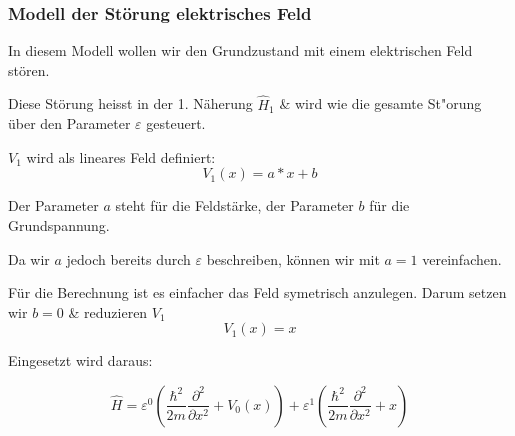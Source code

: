 \begin{refsection}
\subsubsection{ Modell der St\"orung elektrisches Feld }

In diesem Modell wollen wir den Grundzustand mit einem elektrischen Feld st\"oren.

Diese St\"orung heisst in der 1. N\"aherung $\hat H_1$ \& wird wie die gesamte St"orung \"uber den Parameter $\varepsilon$ gesteuert.

$V_1$ wird als lineares Feld definiert:
\begin{equation}
  V_1(x) = a*x + b
\end{equation}

Der Parameter $a$ steht f\"ur die Feldst\"arke, der Parameter $b$ f\"ur die Grundspannung.

Da wir $a$ jedoch bereits durch $\varepsilon$ beschreiben, k\"onnen wir mit $a = 1$ vereinfachen.

F\"ur die Berechnung ist es einfacher das Feld symetrisch anzulegen. Darum setzen wir $b = 0$ \& reduzieren $V_1$
\[
  V_1(x) = x
\]

Eingesetzt wird daraus:

\[
  \hat{H} = \varepsilon^0 ( \frac{\hbar^2}{2m} \frac{\partial^2}{\partial x^2} + V_0(x) )
            + \varepsilon^1 ( \frac{\hbar^2}{2m} \frac{\partial^2}{\partial x^2} + x )
\]



\end{refsection}
